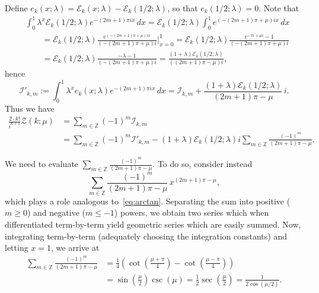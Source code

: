 \documentclass[11pt, oneside]{article}
\newcommand{\Z}{\mathbb{Z}}
\newcommand{\calE}{\mathcal{E}}
\newcommand{\calI}{\mathcal{I}}
\newcommand{\calZ}{\mathcal{Z}}
\theoremstyle{plain}
\theoremstyle{definition}
\begin{document}
Define $e_{k}(x;\lambda) = \calE_{k}(x;\lambda)-\calE_{k}(1/2;\lambda)$, so that $e_{k}(1/2;\lambda)=0$. Note that
\begin{align*}
  & \int_0^1 \lambda^x \calE_{k}(1/2;\lambda) e^{-(2m+1)\pi ix}\,dx 
  = \calE_{k}(1/2;\lambda) \int_0^1 e^{(-(2m+1)\pi + \mu) ix}\,dx \\
  &\qquad= \calE_{k}(1/2;\lambda) \frac{e^{(-(2m+1)\pi + \mu) ix}}{(-(2m+1)\pi + \mu) i}\bigg|_{x=0}^1 
  = \calE_{k}(1/2;\lambda) \frac{e^{-\pi i + \mu i}-1}{(-(2m+1)\pi + \mu) i} \\
  &\qquad= \calE_{k}(1/2;\lambda) \frac{-\lambda-1}{(-(2m+1)\pi + \mu) i} 
  = \frac{(1+\lambda)\calE_{k}(1/2;\lambda)}{((2m+1)\pi-\mu) i},
\end{align*}
hence
\[
  \calI'_{k,m} := \int_0^1 \lambda^x e_{k}(x;\lambda) e^{-(2m+1)\pi ix} \,dx 
  = \calI_{k,m} + \frac{(1+\lambda)\calE_{k}(1/2;\lambda)}{(2m+1)\pi-\mu} \, i.
\]
Thus we have
\begin{align*}
  \frac{2\cdot k!}{i^{k+1}} \calZ(k;\mu) &=  \sum_{m\in\Z} (-1)^m \calI_{k,m} \\
  &= \sum_{m\in\Z} (-1)^m \calI'_{k,m} 
  - (1+\lambda)\calE_{k}(1/2;\lambda) i \sum_{m\in\Z} \frac{(-1)^m}{(2m+1)\pi-\mu}.
\end{align*}

We need to evaluate $\sum_{m\in\Z} \frac{(-1)^m}{(2m+1)\pi-\mu}$. To do so, consider instead
\[
  \sum_{m\in\Z} \frac{(-1)^m}{(2m+1)\pi-\mu} \,x^{(2m+1)\pi-\mu},
\] 
which plays a role analogous to~\eqref{eq:arctan}. Separating the sum into positive ($m \geq 0$) and negative ($m \leq -1$) powers, we obtain two series which when differentiated term-by-term yield geometric series which are easily summed. Now, integrating term-by-term (adequately choosing the integration constants) and letting $x=1$, we arrive at
\begin{align*}
  \sum_{m\in\Z} \frac{(-1)^m}{(2m+1)\pi-\mu}
  &= \frac{1}{4} \left(\cot \left(\frac{\mu +\pi }{4}\right) 
  - \cot \left(\frac{\mu -\pi}{4}\right)\right) \\
  &= \sin \left(\frac{\mu}{2}\right) \csc (\mu)
  = \frac{1}{2} \sec \left(\frac{\mu}{2}\right)
  = \frac{1}{2\cos(\mu/2)}.
\end{align*}
\end{document}
